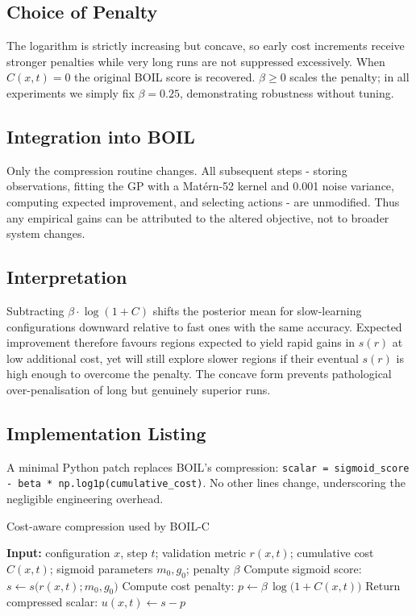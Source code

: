 \documentclass{article} %
\begin{document}
\subsection{Choice of Penalty}
The logarithm is strictly increasing but concave, so early cost increments receive stronger penalties while very long runs are not suppressed excessively. When \(C(x,t)=0\) the original BOIL score is recovered. \(\beta\ge 0\) scales the penalty; in all experiments we simply fix \(\beta=0.25\), demonstrating robustness without tuning.

\subsection{Integration into BOIL}
Only the compression routine changes. All subsequent steps - storing observations, fitting the GP with a Mat\'ern-52 kernel and 0.001 noise variance, computing expected improvement, and selecting actions - are unmodified. Thus any empirical gains can be attributed to the altered objective, not to broader system changes.

\subsection{Interpretation}
Subtracting \(\beta\cdot\log(1+C)\) shifts the posterior mean for slow-learning configurations downward relative to fast ones with the same accuracy. Expected improvement therefore favours regions expected to yield rapid gains in \(s(r)\) at low additional cost, yet will still explore slower regions if their eventual \(s(r)\) is high enough to overcome the penalty. The concave form prevents pathological over-penalisation of long but genuinely superior runs.

\subsection{Implementation Listing}
A minimal Python patch replaces BOIL’s compression: \texttt{scalar = sigmoid\_score - beta * np.log1p(cumulative\_cost)}. No other lines change, underscoring the negligible engineering overhead.

\begin{algorithm}
\caption{Cost-aware compression used by BOIL-C}
\begin{algorithmic}
  \State \textbf{Input:} configuration \(x\), step \(t\); validation metric \(r(x,t)\); cumulative cost \(C(x,t)\); sigmoid parameters \(m_0,g_0\); penalty \(\beta\)
  \State Compute sigmoid score: \(s \leftarrow s\big(r(x,t); m_0, g_0\big)\)
  \State Compute cost penalty: \(p \leftarrow \beta\,\log\big(1 + C(x,t)\big)\)
  \State Return compressed scalar: \(u(x,t) \leftarrow s - p\)
\end{algorithmic}
\end{algorithm}
\end{document}
